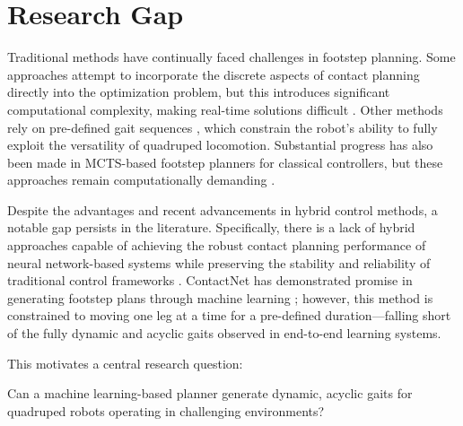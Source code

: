 \section{Research Gap}

Traditional methods have continually faced challenges in footstep
planning. Some approaches attempt to incorporate the discrete aspects
of contact planning directly into the optimization problem, but this
introduces significant computational complexity, making real-time
solutions difficult \cite{winkler_gait_2018}. Other methods rely on
pre-defined gait  sequences
\cite{xie_glide_2023, grandia_perceptive_2022, lee_learning_2020,
villarreal_fast_2019}, which constrain the robot's ability to fully
exploit the versatility of quadruped locomotion. Substantial progress
has also been made in MCTS-based footstep planners for classical
controllers, but these approaches remain computationally demanding
\cite{amatucci_monte_2022, taouil_non-gaited_2025}.

Despite the advantages and recent advancements in hybrid control
methods, a notable gap persists in the literature. Specifically,
there is a lack of hybrid approaches capable of achieving the robust
contact planning performance of neural network-based systems while
preserving the stability and reliability of traditional control
frameworks \cite{Meng2023Mar, Wensing2022Nov}. ContactNet
\cite{bratta_contactnet_2024} has demonstrated promise in generating
footstep plans through machine learning ; however, this method is
constrained to moving one leg at a time for a pre-defined
duration—falling short of the fully dynamic and acyclic gaits
observed in end-to-end learning systems.

This motivates a central research question:

\begin{emphasis}
  Can a machine learning-based planner generate dynamic, acyclic
  gaits for quadruped robots operating in challenging environments?
\end{emphasis}
